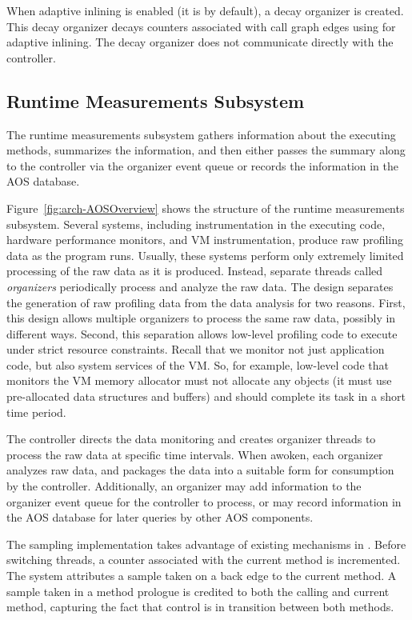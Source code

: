 When adaptive inlining is enabled (it is by default), a decay
organizer is created.  This decay organizer decays counters associated
with call graph edges using for adaptive inlining.  The decay
organizer does not communicate directly with the controller.


\subsection{Runtime Measurements Subsystem}\label{sec:arch:rms}
The runtime measurements subsystem gathers information
about the executing methods, summarizes the information, and then
either passes the summary along to the controller via the organizer
event queue or records the information in the AOS database.

Figure~\ref{fig:arch-AOSOverview} shows the structure of the runtime
measurements subsystem.  
Several systems, including 
instrumentation in the executing
code, 
hardware performance monitors, and VM instrumentation, 
produce
raw profiling data as the program runs.
Usually, these systems perform only extremely limited processing of the
raw data as it is produced.
Instead, separate threads called {\em organizers} periodically 
process and analyze the raw data.
The design separates the generation of raw profiling data from the 
data analysis for two reasons.  First, this design allows
multiple organizers to process the same raw data, possibly in
different ways. Second, this separation allows low-level profiling
code to execute under strict resource constraints.  Recall that
we monitor not just application code, but also system services of the 
VM. So, for example, 
low-level code that monitors the VM memory allocator must not allocate 
any objects (it must use
pre-allocated data structures and buffers) and should complete its
task in a short time period.

The controller directs the data monitoring and creates
organizer threads to process the raw data at specific time
intervals. When awoken, each organizer analyzes raw data, and
packages the data into a suitable form for consumption by the
controller.  Additionally, an organizer may add
information to the organizer event queue for the controller to
process, or may record information in the AOS database for later
queries by other AOS components.

The sampling implementation takes advantage of existing mechanisms in
\jp.  Before switching threads, a counter associated with the current
method is incremented.  The system attributes a sample taken on a back
edge to the current method.  A sample taken in a method prologue is
credited to both the calling and current method, capturing the fact
that control is in transition between both methods. 

